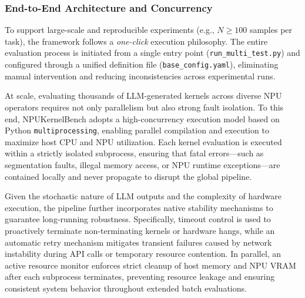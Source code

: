 \subsubsection{End-to-End Architecture and Concurrency}


To support large-scale and reproducible experiments (e.g., $N \geq 100$ samples per task), the framework follows a \emph{one-click} execution philosophy. The entire evaluation process is initiated from a single entry point (\texttt{run\_multi\_test.py}) and configured through a unified definition file (\texttt{base\_config.yaml}), eliminating manual intervention and reducing inconsistencies across experimental runs.

At scale, evaluating thousands of LLM-generated kernels across diverse NPU operators requires not only parallelism but also strong fault isolation. To this end, NPUKernelBench adopts a high-concurrency execution model based on Python \texttt{multiprocessing}, enabling parallel compilation and execution to maximize host CPU and NPU utilization. Each kernel evaluation is executed within a strictly isolated subprocess, ensuring that fatal errors—such as segmentation faults, illegal memory access, or NPU runtime exceptions—are contained locally and never propagate to disrupt the global pipeline.

Given the stochastic nature of LLM outputs and the complexity of hardware execution, the pipeline further incorporates native stability mechanisms to guarantee long-running robustness. Specifically, timeout control is used to proactively terminate non-terminating kernels or hardware hangs, while an automatic retry mechanism mitigates transient failures caused by network instability during API calls or temporary resource contention. In parallel, an active resource monitor enforces strict cleanup of host memory and NPU VRAM after each subprocess terminates, preventing resource leakage and ensuring consistent system behavior throughout extended batch evaluations.

